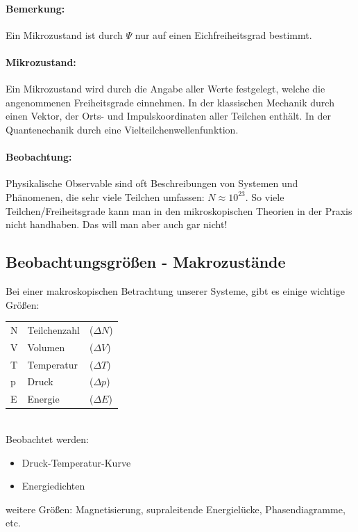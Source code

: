 \paragraph{Bemerkung:} Ein Mikrozustand ist durch $\Psi$ nur auf einen
Eichfreiheitsgrad bestimmt.

\paragraph{Mikrozustand:} Ein Mikrozustand wird durch die Angabe aller Werte
festgelegt, welche die angenommenen Freiheitsgrade einnehmen. In der klassischen
Mechanik durch einen Vektor, der Orts- und Impulskoordinaten aller Teilchen
enthält. In der Quantenechanik durch eine Vielteilchenwellenfunktion.

\paragraph{Beobachtung:} Physikalische Observable sind oft Beschreibungen von
Systemen und Phänomenen, die sehr viele Teilchen umfassen: $ N \approx 10^{23} $.
So viele Teilchen/Freiheitsgrade kann man in den mikroskopischen Theorien in der
Praxis nicht handhaben. Das will man aber auch gar nicht!

    \subsection{Beobachtungsgrößen - Makrozustände}

Bei einer makroskopischen Betrachtung unserer Systeme, gibt es einige wichtige
Größen:\\
\begin{tabular}{l l l}
N &Teilchenzahl &($\Delta N$)\\
V &Volumen      &($\Delta V$)\\
T &Temperatur   &($\Delta T$)\\
p &Druck        &($\Delta p$)\\
E &Energie      &($\Delta E$)
\end{tabular}\\

\noindent
Beobachtet werden:
\begin{itemize}
    \item Druck-Temperatur-Kurve
    \item Energiedichten
\end{itemize}

weitere Größen: Magnetisierung, supraleitende Energielücke, Phasendiagramme, etc.

